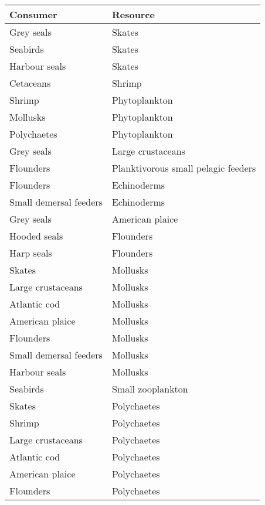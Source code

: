 \newpage
\begin{table}[h!]
  \centering
  \begin{tabular}{|l|l|}
    \hline
      Consumer               & Resource \\
    \hline  \hline
    Grey seals             & Skates \\
    Seabirds               & Skates \\
    Harbour seals          & Skates \\
    Cetaceans              & Shrimp \\
    Shrimp                 & Phytoplankton  \\
    Mollusks               & Phytoplankton  \\
    Polychaetes            & Phytoplankton  \\
    Grey seals             & Large crustaceans  \\
    Flounders              & Planktivorous small pelagic feeders    \\
    Flounders              & Echinoderms    \\
    Small demersal feeders & Echinoderms    \\
    Grey seals             & American plaice    \\
    Hooded seals           & Flounders  \\
    Harp seals             & Flounders  \\
    Skates                 & Mollusks   \\
    Large crustaceans      & Mollusks   \\
    Atlantic cod           & Mollusks   \\
    American plaice        & Mollusks   \\
    Flounders              & Mollusks   \\
    Small demersal feeders & Mollusks   \\
    Harbour seals          & Mollusks   \\
    Seabirds               & Small zooplankton  \\
    Skates                 & Polychaetes    \\
    Shrimp                 & Polychaetes    \\
    Large crustaceans      & Polychaetes    \\
    Atlantic cod           & Polychaetes    \\
    American plaice        & Polychaetes    \\
    Flounders              & Polychaetes    \\

\end{tabular}
\end{table}
